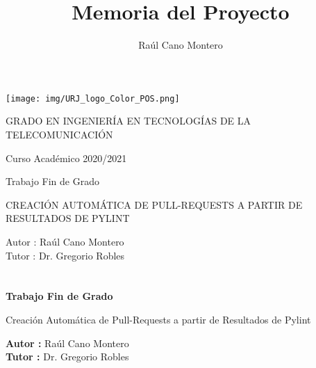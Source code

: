 \documentclass[a4paper, 12pt]{book}
\title{Memoria del Proyecto}
\author{Raúl Cano Montero}
\begin{document}
\renewcommand{\refname}{Bibliografía}  %
\renewcommand{\appendixname}{Apéndice}


\begin{titlepage}
\begin{center}
\texttt{[image: img/URJ\_logo\_Color\_POS.png]}

\vspace{1.75cm}

\Large
GRADO EN INGENIERÍA EN TECNOLOGÍAS DE LA TELECOMUNICACIÓN

\vspace{0.4cm}

\large
Curso Académico 2020/2021

\vspace{0.8cm}

Trabajo Fin de Grado

\vspace{2.5cm}

\LARGE
CREACIÓN AUTOMÁTICA DE PULL-REQUESTS A PARTIR DE RESULTADOS DE PYLINT

\vspace{4cm}

\large
Autor : Raúl Cano Montero \\
Tutor : Dr. Gregorio Robles
\end{center}
\end{titlepage}

\newpage
\mbox{}
\thispagestyle{empty} %


\clearpage
{}
\chapter*{}

\vspace{-4cm}
\begin{center}
\LARGE
\textbf{Trabajo Fin de Grado}

\vspace{1cm}
\large
Creación Automática de Pull-Requests a partir de Resultados de Pylint

\vspace{1cm}
\large
\textbf{Autor :} Raúl Cano Montero \\
\textbf{Tutor :} Dr. Gregorio Robles

\end{center}
\end{document}
